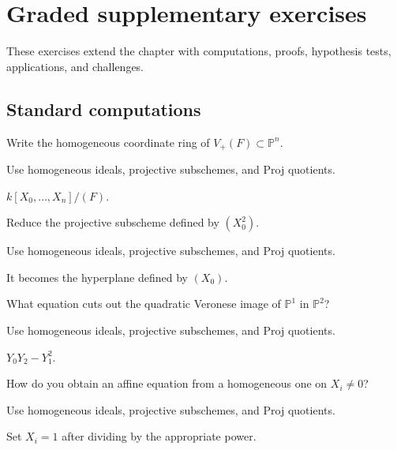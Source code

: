 \section{Graded supplementary exercises}
These exercises extend the chapter with computations, proofs, hypothesis tests, applications, and challenges.

\subsection*{Standard computations}

\begin{exercise}\label{exr:vi37-expand-01}
Write the homogeneous coordinate ring of $V_+(F)\subset\mathbb P^n$.
\end{exercise}
\begin{hint}
Use homogeneous ideals, projective subschemes, and Proj quotients.
\end{hint}
\begin{solution}
$k[X_0,\ldots,X_n]/(F)$.
\end{solution}

\begin{exercise}[Reduction]\label{exr:vi37-expand-02}
Reduce the projective subscheme defined by $(X_0^2)$.
\end{exercise}
\begin{hint}
Use homogeneous ideals, projective subschemes, and Proj quotients.
\end{hint}
\begin{solution}
It becomes the hyperplane defined by $(X_0)$.
\end{solution}

\begin{exercise}\label{exr:vi37-expand-03}
What equation cuts out the quadratic Veronese image of $\mathbb P^1$ in $\mathbb P^2$?
\end{exercise}
\begin{hint}
Use homogeneous ideals, projective subschemes, and Proj quotients.
\end{hint}
\begin{solution}
$Y_0Y_2-Y_1^2$.
\end{solution}

\begin{exercise}\label{exr:vi37-expand-04}
How do you obtain an affine equation from a homogeneous one on $X_i\ne0$?
\end{exercise}
\begin{hint}
Use homogeneous ideals, projective subschemes, and Proj quotients.
\end{hint}
\begin{solution}
Set $X_i=1$ after dividing by the appropriate power.
\end{solution}

